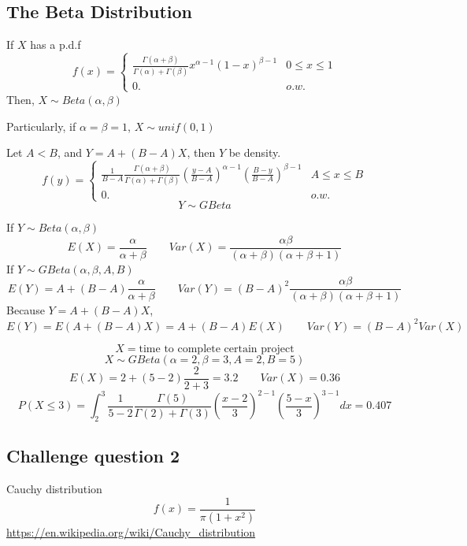 \subsection{The Beta Distribution}
If $X$ has a p.d.f 
\[f(x)=\begin{cases}
\frac{\Gamma(\alpha+\beta)}{\Gamma(\alpha)+\Gamma(\beta)}x^{\alpha-1}(1-x)^{\beta-1}  & 0 \leq x \leq 1 \\
0. & o.w.
\end{cases}\]
Then, $X \sim Beta(\alpha,\beta)$

\begin{prop}
Particularly, if $\alpha=\beta=1$, $X \sim unif(0,1)$
\end{prop}

\begin{prop}
Let $A < B$, and $Y=A+(B-A)X$, then $Y$ be density.
\[f(y)=\begin{cases}
\frac{1}{B-A}\frac{\Gamma(\alpha+\beta)}{\Gamma(\alpha)+\Gamma(\beta)}\left(\frac{y-A}{B-A}\right)^{\alpha-1}\left(\frac{B-y}{B-A}\right)^{\beta-1}  & A \leq x \leq B \\
0. & o.w.
\end{cases}\]
\[Y \sim GBeta\]
\end{prop}

\begin{prop}
If $Y \sim Beta(\alpha,\beta)$
\[E(X)=\frac{\alpha}{\alpha+\beta} \qquad Var(X)=\frac{\alpha\beta}{(\alpha+\beta)(\alpha+\beta+1)}\]
If $Y \sim GBeta(\alpha,\beta,A,B)$
\[E(Y)=A+(B-A)\frac{\alpha}{\alpha+\beta} \qquad Var(Y)=(B-A)^2 \frac{\alpha\beta}{(\alpha+\beta)(\alpha+\beta+1)} \]
Because $Y=A+(B-A)X$, \[E(Y)=E(A+(B-A)X)=A+(B-A)E(X) \qquad Var(Y)=(B-A)^2 Var(X)\]
\end{prop}

\begin{exmp}
\[X=\text{time to complete certain project}\]
\[X \sim GBeta(\alpha=2,\beta=3,A=2,B=5)\]
\[E(X)=2 + (5-2)\frac{2}{2+3}=3.2 \qquad Var(X)=0.36\]
\[P(X \leq 3)=\int_{2}^{3} \frac{1}{5-2}\frac{\Gamma(5)}{\Gamma(2)+\Gamma(3)}\left(\frac{x-2}{3}\right)^{2-1}\left(\frac{5-x}{3}\right)^{3-1} dx=\boxed{0.407}\]
\end{exmp}

\subsection{Challenge question 2}
Cauchy distribution
\[f(x)=\frac{1}{\pi(1+x^2)}\]
\url{https://en.wikipedia.org/wiki/Cauchy_distribution}